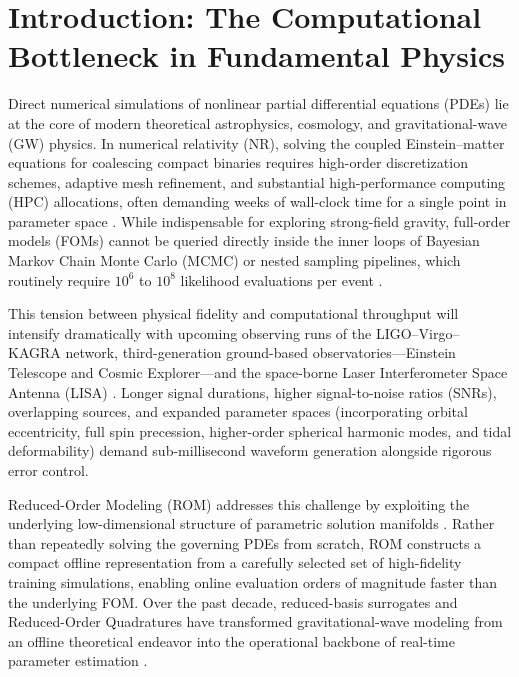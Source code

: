 \documentclass[11pt, a4paper]{article}
\begin{document}
\vspace{8pt}
\section{Introduction: The Computational Bottleneck in Fundamental Physics}

Direct numerical simulations of nonlinear partial differential equations (PDEs) lie at the core of modern theoretical astrophysics, cosmology, and gravitational-wave (GW) physics. In numerical relativity (NR), solving the coupled Einstein--matter equations for coalescing compact binaries requires high-order discretization schemes, adaptive mesh refinement, and substantial high-performance computing (HPC) allocations, often demanding weeks of wall-clock time for a single point in parameter space \cite{Boyle2019}. While indispensable for exploring strong-field gravity, full-order models (FOMs) cannot be queried directly inside the inner loops of Bayesian Markov Chain Monte Carlo (MCMC) or nested sampling pipelines, which routinely require $10^6$ to $10^8$ likelihood evaluations per event \cite{Veitch2015,Ashton2019}.

This tension between physical fidelity and computational throughput will intensify dramatically with upcoming observing runs of the LIGO--Virgo--KAGRA network, third-generation ground-based observatories---Einstein Telescope and Cosmic Explorer---and the space-borne Laser Interferometer Space Antenna (LISA) \cite{Punturo2010,AmaroSeoane2017}. Longer signal durations, higher signal-to-noise ratios (SNRs), overlapping sources, and expanded parameter spaces (incorporating orbital eccentricity, full spin precession, higher-order spherical harmonic modes, and tidal deformability) demand sub-millisecond waveform generation alongside rigorous error control.

Reduced-Order Modeling (ROM) addresses this challenge by exploiting the underlying low-dimensional structure of parametric solution manifolds \cite{Quarteroni2016,Hesthaven2016}. Rather than repeatedly solving the governing PDEs from scratch, ROM constructs a compact offline representation from a carefully selected set of high-fidelity training simulations, enabling online evaluation orders of magnitude faster than the underlying FOM. Over the past decade, reduced-basis surrogates and Reduced-Order Quadratures have transformed gravitational-wave modeling from an offline theoretical endeavor into the operational backbone of real-time parameter estimation \cite{Field2011,Field2014,Tiglio2022}.
\end{document}
